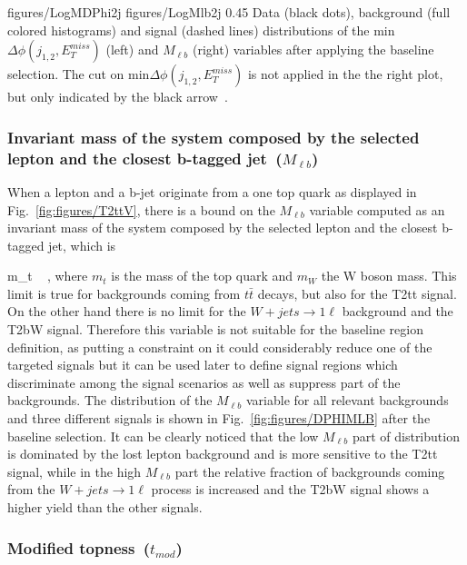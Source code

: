                  {figures/LogMDPhi2j} %
                 {figures/LogMlb2j} %
                 {0.45}       %
                 { Data (black dots), background (full colored histograms) and signal (dashed lines) distributions of the min$\Delta \phi (j_{1,2}, E_{T}^{miss})$ (left) and $M_{\ell b}$ (right) variables after applying the baseline selection. The cut on min$\Delta \phi (j_{1,2}, E_{T}^{miss})$  is not applied in the the right plot, but only indicated by the black arrow~\cite{website:stopSupp}. }

\subsubsection{Invariant mass of the system composed by the selected lepton and the closest b-tagged jet~($M_{\ell b}$)}

When a lepton and a b-jet originate from a one top quark as displayed in Fig.~\ref{fig:figures/T2ttV}, there is a bound on the $M_{\ell b}$ variable computed as an invariant mass of the system composed by the selected lepton and the closest b-tagged jet, which is

{
 m_{t}  ~ ,
}
where $m_{t}$ is the mass of the top quark and $m_{W}$ the W boson mass. This limit is true for backgrounds coming from $t\bar{t}$ decays, but also for the T2tt signal. On the other hand there is no limit for the $W+jets \to 1\ell$  background and the T2bW signal. Therefore this variable is not suitable for the baseline region definition, as putting a constraint on it could considerably reduce one of the targeted signals but it can be used later to define signal regions which discriminate among the signal scenarios as well as suppress part of the backgrounds. The distribution of the  $M_{\ell b}$ variable for all relevant backgrounds and three different signals is shown in Fig.~\ref{fig:figures/DPHIMLB} after the baseline selection. It can be clearly noticed that the low $M_{\ell b}$ part of distribution is dominated by the lost lepton background and is more sensitive to the T2tt signal, while in  the high $M_{\ell b}$ part the relative fraction of backgrounds coming from the $W+jets \to 1\ell$ process is increased and the T2bW  signal shows a higher yield than the other signals.

\subsubsection{Modified topness~($t_{mod}$)}

